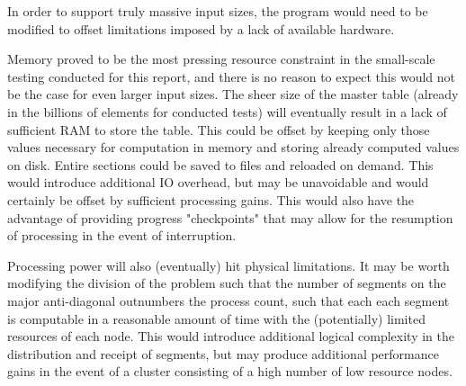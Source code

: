 In order to support truly massive input sizes, the program would need to be modified to offset limitations imposed by a lack of available hardware. 

Memory proved to be the most pressing resource constraint in the small-scale testing conducted for this report, and there is no reason to expect this would not be the case for even larger input sizes. The sheer size of the master table (already in the billions of elements for conducted tests) will eventually result in a lack of sufficient RAM to store the table. This could be offset by keeping only those values necessary for computation in memory and storing already computed values on disk. Entire sections could be saved to files and reloaded on demand. This would introduce additional IO overhead, but may be unavoidable and would certainly be offset by sufficient processing gains. This would also have the advantage of providing progress "checkpoints" that may allow for the resumption of processing in the event of interruption.

Processing power will also (eventually) hit physical limitations. It may be worth modifying the division of the problem such that the number of segments on the major anti-diagonal outnumbers the process count, such that each each segment is computable in a reasonable amount of time with the (potentially) limited resources of each node. This would introduce additional logical complexity in the distribution and receipt of segments, but may produce additional performance gains in the event of a cluster consisting of a high number of low resource nodes.